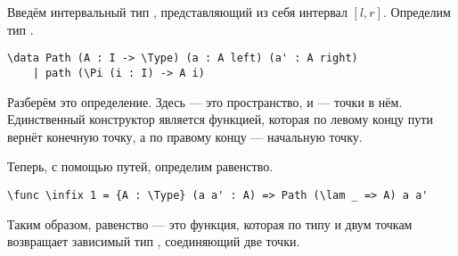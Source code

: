 Введём интервальный тип , представляющий из себя интервал $[l, r]$.
Определим тип .

\begin{verbatim}
\data Path (A : I -> \Type) (a : A left) (a' : A right)
    | path (\Pi (i : I) -> A i)
\end{verbatim} 

Разберём это определение. Здесь  --- это пространство,  и  --- точки в нём.
Единственный конструктор является функцией, которая по левому концу пути вернёт конечную точку, а по правому концу --- начальную точку.

Теперь, с помощью путей, определим равенство.

\begin{verbatim}
\func \infix 1 = {A : \Type} (a a' : A) => Path (\lam _ => A) a a'
\end{verbatim}

Таким образом, равенство --- это функция, которая по типу и двум точкам возвращает
зависимый тип , соединяющий две точки.

